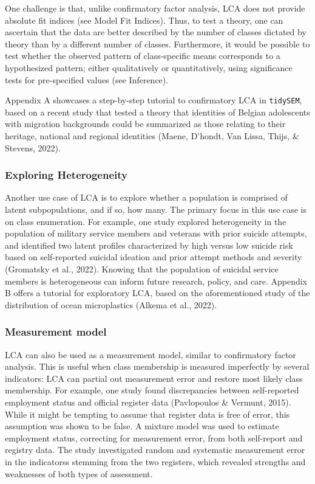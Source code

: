 \documentclass[
  ,man,floatsintext]{apa6}
\begin{document}
One challenge is that, unlike confirmatory factor analysis, LCA does not provide absolute fit indices (see Model Fit Indices).
Thus, to test a theory, one can ascertain that the data are better described by the number of classes dictated by theory than by a different number of classes.
Furthermore, it would be possible to test whether the observed pattern of class-specific means corresponds to a hypothesized pattern;
either qualitatively or quantitatively, using significance tests for pre-specified values (see Inference).

Appendix A showcases a step-by-step tutorial to confirmatory LCA in \texttt{tidySEM},
based on a recent study that tested a theory that identities of Belgian adolescents with migration backgrounds could be summarized as those relating to their heritage, national and regional identities (Maene, D'hondt, Van Lissa, Thijs, \& Stevens, 2022).

\hypertarget{exploring-heterogeneity}{%
\subsubsection{Exploring Heterogeneity}\label{exploring-heterogeneity}}

Another use case of LCA is to explore whether a population is comprised of latent subpopulations, and if so, how many.
The primary focus in this use case is on class enumeration.
For example,
one study explored heterogeneity in the population of military service members and veterans with prior suicide attempts,
and identified two latent profiles characterized by high versus low suicide risk based on self-reported suicidal ideation and prior attempt methods and severity
(Gromatsky et al., 2022).
Knowing that the population of suicidal service members is heterogeneous can inform future research, policy, and care.
Appendix B offers a tutorial for exploratory LCA,
based on the aforementioned study of the distribution of ocean microplastics (Alkema et al., 2022).

\hypertarget{measurement-model}{%
\subsubsection{Measurement model}\label{measurement-model}}

LCA can also be used as a measurement model, similar to confirmatory factor analysis.
This is useful when class membership is measured imperfectly by several indicators:
LCA can partial out measurement error and restore most likely class membership.
For example, one study found discrepancies between self-reported employment status and official register data (Pavlopoulos \& Vermunt, 2015).
While it might be tempting to assume that register data is free of error, this assumption was shown to be false.
A mixture model was used to estimate employment status, correcting for measurement error, from both self-report and registry data.
The study investigated random and systematic measurement error in the indicatorss stemming from the two registers,
which revealed strengths and weaknesses of both types of assessment.
\end{document}

